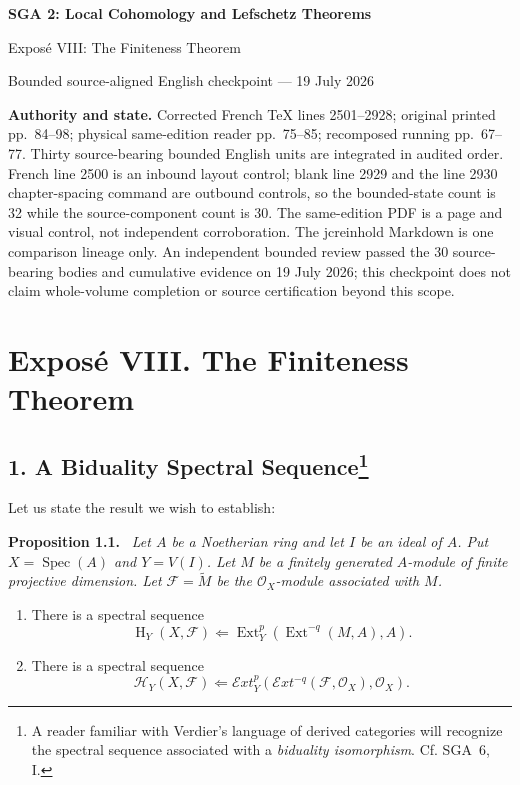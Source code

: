 \documentclass[10pt,a4paper]{article}
\newcommand{\OX}{\mathcal O_X}
\newcommand{\Hloc}{\operatorname H}
\newcommand{\Ext}{\operatorname{Ext}}
\newcommand{\SheafExt}{\mathcal E\!xt}
\newcommand{\SheafH}{\mathcal H}
\newenvironment{sgastatement}[1]{\par\addvspace{0.75\baselineskip}\noindent\textbf{#1.}\ \itshape}{\par}
\theoremstyle{sgatheorem}
\theoremstyle{plain}
\numberwithin{equation}{section}
\begin{document}
\begin{center}
  {\Large\bfseries SGA 2: Local Cohomology and Lefschetz Theorems}\par\smallskip
  {\large Expos\'e VIII: The Finiteness Theorem}\par
  \small Bounded source-aligned English checkpoint --- 19 July 2026
\end{center}
\noindent\colorbox{softgray}{\parbox{0.95\linewidth}{\footnotesize\textbf{Authority and state.}
Corrected French TeX lines 2501--2928; original printed pp.~84--98;
physical same-edition reader pp.~75--85; recomposed running pp.~67--77.
Thirty source-bearing bounded English units are integrated in audited order.
French line 2500 is an inbound layout control; blank line 2929 and the line
2930 chapter-spacing command are outbound controls, so the bounded-state count
is 32 while the source-component count is 30. The same-edition PDF is a page
and visual control, not independent corroboration. The jcreinhold Markdown is
one comparison lineage only. An independent bounded review passed the 30
source-bearing bodies and cumulative evidence on 19 July 2026; this checkpoint
does not claim whole-volume completion or source certification beyond this scope.}}


\section*{Expos\'e VIII. The Finiteness Theorem}

\subsection*{1. A Biduality Spectral Sequence\footnote{A reader familiar with
Verdier's language of derived categories will recognize the spectral sequence
associated with a \emph{biduality isomorphism}. Cf. SGA~6, I.}}

Let us state the result we wish to establish:

\begin{sgastatement}{Proposition 1.1}
Let $A$ be a Noetherian ring and let $I$ be an ideal of $A$. Put
$X=\operatorname{Spec}(A)$ and $Y=V(I)$. Let $M$ be a finitely generated
$A$-module of finite projective dimension. Let
$\mathcal F=\widetilde M$ be the $\OX$-module associated with $M$.
\begin{enumerate}
\item[\textup{1)}] There is a spectral sequence
\[
  \Hloc_Y(X,\mathcal F)\Longleftarrow
  \Ext_Y^p(\Ext^{-q}(M,A),A).
\]
\item[\textup{2)}] There is a spectral sequence
\[
  \SheafH_Y(X,\mathcal F)\Longleftarrow
  \SheafExt_Y^p(\SheafExt^{-q}(\mathcal F,\OX),\OX).
\]
\end{enumerate}
\end{sgastatement}
\end{document}

